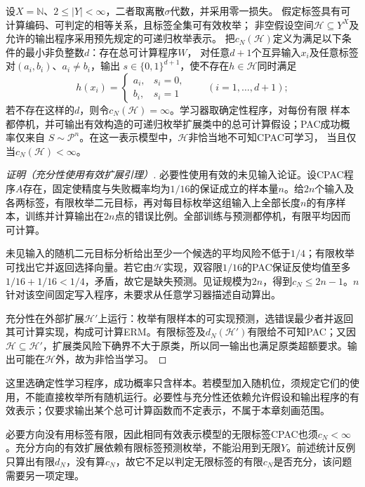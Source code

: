 \begin{theorem}[有限标签的非恰当CPAC刻画]
\label{thm:computable-multiclass-characterization}
设$X=\mathbb N$、$2\leq|Y|<\infty$，二者取离散$\sigma$代数，并采用零一损失。
假定标签具有可计算编码、可判定的相等关系，且标签全集可有效枚举；
非空假设空间$\mathcal H\subseteq Y^X$及允许的输出程序采用预先规定的可递归枚举表示。
把$c_N(\mathcal H)$定义为满足以下条件的最小非负整数$d$：存在总可计算程序$W$，
对任意$d+1$个互异输入$x_i$及任意标签对$(a_i,b_i)$、$a_i\neq b_i$，输出
$s\in\{0,1\}^{d+1}$，使不存在$h\in\mathcal H$同时满足
\[
 h(x_i)=\begin{cases}a_i,&s_i=0,\\b_i,&s_i=1\end{cases}
 \qquad(i=1,\ldots,d+1);
\]
若不存在这样的$d$，则令$c_N(\mathcal H)=\infty$。学习器取确定性程序，对每份有限
样本都停机，并可输出有效构造的可递归枚举扩展类中的总可计算假设；PAC成功概率仅来自
$S\sim\mathcal P^n$。在这一表示模型中，$\mathcal H$非恰当地不可知CPAC可学习，
当且仅当$c_N(\mathcal H)<\infty$。
\end{theorem}
\begin{proof}[证明（充分性使用有效扩展引理）]
必要性使用有效的未见输入论证。设CPAC程序$A$存在，固定使精度与失败概率均为$1/16$的保证成立的样本量$n$。给$2n$个输入及各两标签，有限枚举二元目标，再对每目标枚举这组输入上全部长度$n$的有序样本，训练并计算输出在$2n$点的错误比例。全部训练与预测都停机，有限平均因而可计算。

未见输入的随机二元目标分析给出至少一个候选的平均风险不低于$1/4$；有限枚举可找出它并返回选择向量。若它由$\mathcal H$实现，双容限$1/16$的PAC保证反使均值至多$1/16+1/16<1/4$，矛盾，故它是缺失预测。见证规模为$2n$，得到$c_N\leq2n-1$。$n$针对该空间固定写入程序，未要求从任意学习器描述自动算出。

充分性在外部扩展$\mathcal H'$上运行：枚举有限样本的可实现预测，选错误最少者并返回其可计算实现，构成可计算ERM。有限标签及$d_N(\mathcal H')$有限给不可知PAC；又因$\mathcal H\subseteq\mathcal H'$，扩展类风险下确界不大于原类，所以同一输出也满足原类超额要求。输出可能在$\mathcal H$外，故为非恰当学习。
\end{proof}

这里选确定性学习程序，成功概率只含样本。若模型加入随机位，须规定它们的使用，不能直接枚举所有随机运行。必要性与充分性还依赖允许假设和输出程序的有效表示；仅要求输出某个总可计算函数而不定表示，不属于本章刻画范围。

必要方向没有用标签有限，因此相同有效表示模型的无限标签CPAC也须$c_N<\infty$。充分方向的有效扩展依赖有限标签预测枚举，不能沿用到无限$Y$。前述统计反例只算出有限$d_N$，没有算$c_N$，故它不足以判定无限标签的有限$c_N$是否充分，该问题需要另一项定理。

